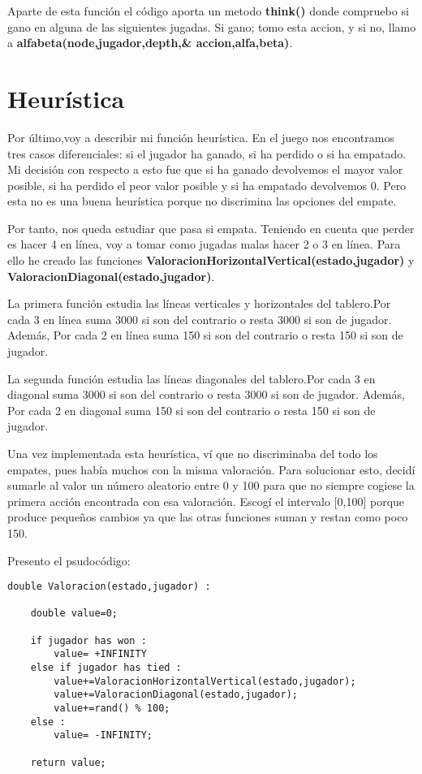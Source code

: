\documentclass[11pt,a4paper]{article}
\begin{document}
Aparte de esta función el código aporta un metodo \textbf{think()} donde compruebo si gano en alguna de las siguientes jugadas. Si gano; tomo esta accion, y si no, llamo a \textbf{alfabeta(node,jugador,depth,\& accion,alfa,beta)}.
\\ 

\section{Heurística}
Por último,voy a describir mi función heurística. En el juego nos encontramos tres casos diferenciales: si el jugador ha ganado, si ha perdido o si ha empatado. Mi decisión con respecto a esto fue que si ha ganado devolvemos el mayor valor posible, si ha perdido el peor valor posible y si ha empatado devolvemos 0. Pero esta no es una buena heurística porque no discrimina las opciones del empate. \newline

Por tanto, nos queda estudiar que pasa si empata. Teniendo en cuenta que perder es hacer 4 en línea, voy a tomar como jugadas malas hacer 2 o 3 en línea. Para ello he creado las funciones \textbf{ValoracionHorizontalVertical(estado,jugador)} y \textbf{ValoracionDiagonal(estado,jugador)}.\newline

La primera función estudia las líneas verticales y horizontales del tablero.Por cada 3 en línea suma 3000 si son del contrario o resta 3000 si son de jugador. Además, Por cada 2 en línea suma 150 si son del contrario o resta 150 si son de jugador. \newline

La segunda función estudia las líneas diagonales del tablero.Por cada 3 en diagonal suma 3000 si son del contrario o resta 3000 si son de jugador. Además, Por cada 2 en diagonal suma 150 si son del contrario o resta 150 si son de jugador. \newline

Una vez implementada esta heurística, ví que no discriminaba del todo los empates, pues había muchos con la misma valoración. Para solucionar esto, decidí sumarle al valor un número aleatorio entre 0 y 100 para que no siempre cogiese la primera acción encontrada con esa valoración. Escogí el intervalo [0,100] porque produce pequeños cambios ya que las otras funciones suman y restan como poco 150.\newline

Presento el psudocódigo:

\begin{lstlisting}[basicstyle=\small] 	
double Valoracion(estado,jugador) :

    double value=0;

    if jugador has won :
        value= +INFINITY
    else if jugador has tied :
        value+=ValoracionHorizontalVertical(estado,jugador);
        value+=ValoracionDiagonal(estado,jugador);
        value+=rand() % 100;
    else :                                 
        value= -INFINITY;
    
    return value;


\end{lstlisting}
\end{document}
